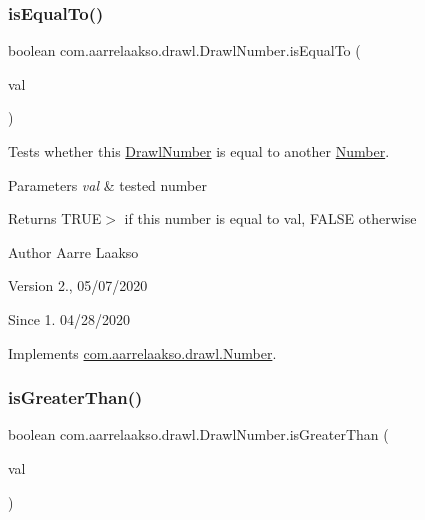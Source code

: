 \subsubsection{\texorpdfstring{is\+Equal\+To()}{isEqualTo()}}
{\footnotesize\ttfamily boolean com.\+aarrelaakso.\+drawl.\+Drawl\+Number.\+is\+Equal\+To (\begin{DoxyParamCaption}\item[{@Not\+Null final \hyperlink{interfacecom_1_1aarrelaakso_1_1drawl_1_1_number}{Number}}]{val }\end{DoxyParamCaption})}



Tests whether this \hyperlink{classcom_1_1aarrelaakso_1_1drawl_1_1_drawl_number}{Drawl\+Number} is equal to another \hyperlink{interfacecom_1_1aarrelaakso_1_1drawl_1_1_number}{Number}. 


\begin{DoxyParams}{Parameters}
{\em val} & tested number \\
\hline
\end{DoxyParams}
\begin{DoxyReturn}{Returns}
{\ttfamily T\+R\+UE}$>$ if this number is equal to val, {\ttfamily F\+A\+L\+SE} otherwise 
\end{DoxyReturn}
\begin{DoxyAuthor}{Author}
Aarre Laakso 
\end{DoxyAuthor}
\begin{DoxyVersion}{Version}
2., 05/07/2020 
\end{DoxyVersion}
\begin{DoxySince}{Since}
1. 04/28/2020 
\end{DoxySince}


Implements \hyperlink{interfacecom_1_1aarrelaakso_1_1drawl_1_1_number_aa8ef6fc2e77da054f3a42f2cd81ec8a6}{com.\+aarrelaakso.\+drawl.\+Number}.

\mbox{\label{classcom_1_1aarrelaakso_1_1drawl_1_1_drawl_number_a17616696cef2e7b72d2614481182293a}} 
\subsubsection{\texorpdfstring{is\+Greater\+Than()}{isGreaterThan()}\hspace{0.1cm}{\footnotesize\ttfamily [1/2]}}
{\footnotesize\ttfamily boolean com.\+aarrelaakso.\+drawl.\+Drawl\+Number.\+is\+Greater\+Than (\begin{DoxyParamCaption}\item[{@Not\+Null final \hyperlink{interfacecom_1_1aarrelaakso_1_1drawl_1_1_number}{Number}}]{val }\end{DoxyParamCaption})}



